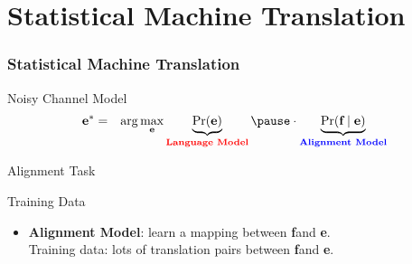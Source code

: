 




\newcommand{\tgt}{\textbf{e}}
\newcommand{\src}{\textbf{f}}
\newcommand{\aln}{\textbf{a}}


\section{Statistical Machine Translation}
\frame{\tableofcontents[currentsection]}

\begin{frame}
\frametitle{Statistical Machine Translation}
\begin{block}{Noisy Channel Model}
\begin{eqnarray*}
\tgt^\ast & = & \arg\max_{\tgt} \underbrace{\Pr(\tgt)}_{\color{red}\textbf{Language Model}} \pause \cdot \underbrace{\Pr(\src \mid \tgt)}_{\color{blue}\textbf{Alignment Model}}
\end{eqnarray*}
\end{block}
\end{frame}

\begin{frame}
\def\blockdist{2.0}
\begin{alertblock}{Alignment Task}
\end{alertblock}\pause
\begin{alertblock}{Training Data}
\begin{itemize}[<+->]
\item \color{blue}\textbf{Alignment Model}: learn a mapping between \src and \tgt. \\
Training data: lots of translation pairs between \src and \tgt.
\end{itemize}
\end{alertblock}
\end{frame}

